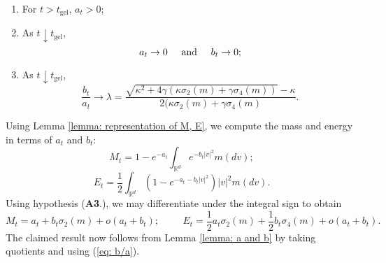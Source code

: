 \begin{lemma}
\begin{enumerate}[label=\roman{*}).]
    \item For $t>t_\mathrm{gel}$, $a_t>0$;
    \item As $t\downarrow t_\mathrm{gel}$, \begin{equation}
        a_t \rightarrow 0 \hspace{0.5cm} \text{and} \hspace{0.5cm} b_t\rightarrow 0;
    \end{equation}
    \item As $t\downarrow t_\mathrm{gel}$, \begin{equation} \label{eq: b/a}
        \frac{b_t}{a_t}\rightarrow\lambda= \frac{\sqrt{\kappa^2+4\gamma(\kappa\sigma_2(m)+\gamma \sigma_4(m))}-\kappa}{2(\kappa\sigma_2(m)+\gamma\sigma_4(m)}.
    \end{equation}
\end{enumerate}  \end{lemma}  Using Lemma \ref{lemma: representation of M, E}, we compute the mass and energy in terms of $a_t$ and $b_t$:\begin{equation}
    M_t=1-e^{-a_t}\int_{\mathbb{R}^d} e^{-b_t|v|^2}m(dv);
\end{equation}\begin{equation}
    E_t=\frac{1}{2}\int_{\mathbb{R}^d}\left(1-e^{-a_t-b_t|v|^2}\right)|v|^2m(dv).
\end{equation} Using hypothesis (\textbf{A3}.), we may differentiate under the integral sign to obtain \begin{equation}
    M_t=a_t+b_t\sigma_2(m)+o(a_t+b_t); \hspace{1cm} E_t=\frac{1}{2}a_t\sigma_2(m)+\frac{1}{2}b_t\sigma_4(m)+o(a_t+b_t).
\end{equation} The claimed result now follows from Lemma \ref{lemma: a and b} by taking quotients and using (\ref{eq: b/a}). 
